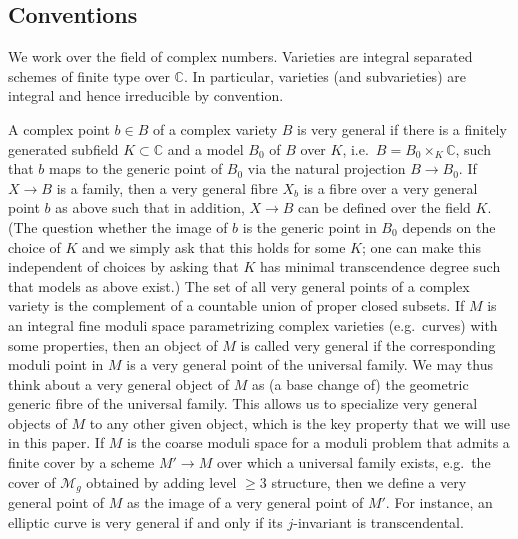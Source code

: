 \documentclass[a4paper,11pt,reqno]{amsart}
\numberwithin{equation}{section}
\theoremstyle{plain}
\theoremstyle{definition}
\newcommand{\C}{\mathbb C}
\newcommand{\ca}[1]{{\mathcal{#1}}}
\begin{document}
\subsection{Conventions} \label{section:conventions}
We work over the field of complex numbers.
Varieties are integral separated schemes of finite type over $\C$. 
In particular, varieties  (and subvarieties) are integral and hence irreducible by convention.

A complex point $b\in B$ of a complex variety $B$ is very general if there is a finitely generated subfield $K\subset \C$ and a model $B_0$ of $B$ over $K$, i.e.\ $B=B_0\times_K\C$, such that $b$ maps to the generic point of $B_0$ via the natural projection $B\to B_0$.
If $X\to B$ is a family, then a very general fibre $X_b$ is a fibre over a very general point $b$ as above such that in addition, $X\to B$ can be defined over the field $K$.
(The question whether the image of $b$ is the generic point in $B_0$ depends on the choice of $K$ and we simply ask that this holds for some $K$; one can make this independent of choices by asking that $K$ has minimal transcendence degree such that models as above exist.)
The set of all very general points of a complex variety is the complement of a countable union of proper closed subsets.
If $M$ is an integral fine moduli space parametrizing complex varieties (e.g.\ curves) with some properties, then an object of $M$ is called very general if the corresponding moduli point in $M$ is a very general point of the universal family. 
We may thus think about a very general object of $M$ as (a base change  of) the geometric generic fibre of the universal family.
This allows us to specialize very general objects of $M$ to any other given object, which is the key property that we will use in this paper. 
If $M$ is the coarse moduli space for a moduli problem that admits a finite cover by a scheme $M' \to M$ over which a universal family exists, e.g.\ the cover of $\ca M_g$ obtained by adding level $\geq 3$ structure, then we define a very general point of $M$ as the image of a very general point of $M'$.
For instance, an elliptic curve is very general if and only if its $j$-invariant is transcendental.
\end{document}
